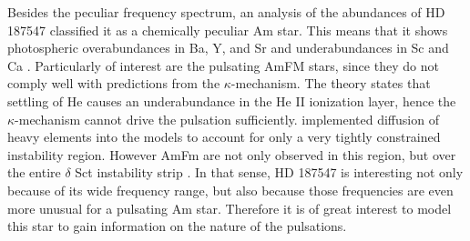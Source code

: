 Besides the peculiar frequency spectrum, an analysis of the abundances of HD 187547 classified it as a chemically peculiar Am star. This means that it shows photospheric overabundances in Ba, Y, and Sr and underabundances in Sc and Ca \citep{preston1974chemically}. Particularly of interest are the pulsating AmFM stars, since they do not comply well with predictions from the $\kappa$-mechanism. The theory states that settling of He causes an underabundance in the He II ionization layer, hence the $\kappa$-mechanism cannot drive the pulsation sufficiently. \citet{turcotte2000} implemented diffusion of heavy elements into the models to account for only a very tightly constrained instability region. However AmFm are not only observed in this region, but over the entire $\delta$ Sct instability strip \citep{smalley2011superwasp, balona2011kepler}. In that sense, HD 187547 is interesting not only because of its wide frequency range, but also because those frequencies are even more unusual for a pulsating Am star. Therefore it is of great interest to model this star to gain information on the nature of the pulsations. 
\\



